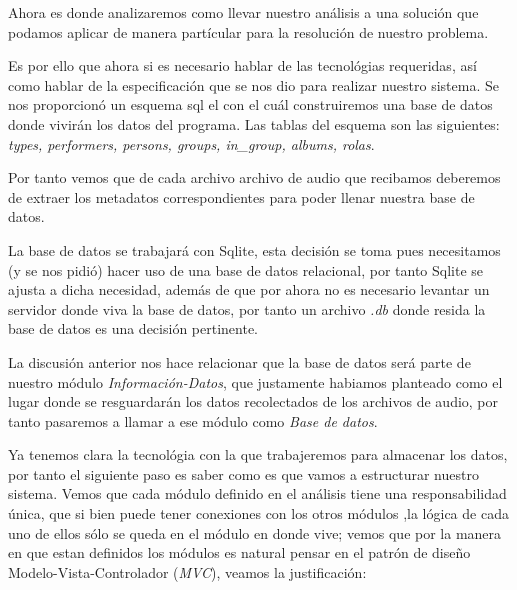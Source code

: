 \documentclass[10pt,letterpaper]{report}
\begin{document}
\noindent Ahora es donde analizaremos como llevar nuestro análisis a una solución que podamos aplicar de manera partícular para la resolución de nuestro problema.

\vspace{0.2 cm}

\noindent Es por ello que ahora si es necesario hablar de las tecnológias requeridas, así como hablar de la especificación que se nos dio para realizar nuestro sistema.
Se nos proporcionó un esquema sql el con el cuál construiremos una base de datos donde vivirán los datos del programa. Las tablas del esquema son las siguientes: \textit{types, performers, persons, groups, in\_group, albums, rolas}.

\vspace{0.2cm}

\noindent Por tanto vemos que de cada archivo archivo de audio que recibamos deberemos de extraer los metadatos correspondientes para poder llenar nuestra base de datos.

\noindent La base de datos se trabajará con Sqlite, esta decisión se toma pues necesitamos (y se nos pidió) hacer uso de una base de datos relacional, por tanto Sqlite se ajusta a dicha necesidad, además de que por ahora no es necesario levantar un servidor donde viva la base de datos, por tanto un archivo \textit{.db} donde resida la base de datos es una decisión pertinente.

\vspace{0.2cm}

\noindent La discusión anterior nos hace relacionar que la base de datos será parte de nuestro módulo \textit{Información-Datos}, que justamente habiamos planteado como el lugar donde se resguardarán los datos recolectados de los archivos de audio, por tanto pasaremos a llamar a ese módulo como \textit{Base de datos}.

\vspace{0.5 cm}

\noindent Ya tenemos clara la tecnológia con la que trabajeremos para almacenar los datos, por tanto el siguiente paso es saber como es que vamos a estructurar nuestro sistema. Vemos que cada módulo definido en el análisis tiene una responsabilidad única, que si bien puede tener conexiones con los otros módulos ,la lógica de cada uno de ellos sólo se queda en el módulo en donde vive; vemos que por la manera en que estan definidos los módulos es natural pensar en el patrón de diseño Modelo-Vista-Controlador (\textit{MVC}), veamos la justificación:
\end{document}
